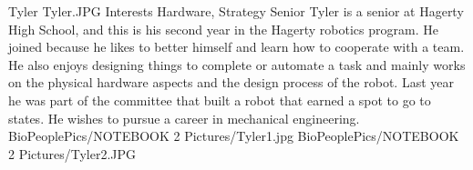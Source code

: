\insertbio
{Tyler}
{Tyler.JPG}
{Interests}
{Hardware, Strategy}
{Senior}
{  
Tyler is a senior at Hagerty High School, and this is his second year in the Hagerty robotics program. He joined because he likes to better himself and learn how to cooperate with a team. He also enjoys designing things to complete or automate a task and mainly works on the physical hardware aspects and the design process of the robot. Last year he was part of the committee that built a robot that earned a spot to go to states. He wishes to pursue a career in mechanical engineering. 
}
{BioPeoplePics/NOTEBOOK 2 Pictures/Tyler1.jpg}
{BioPeoplePics/NOTEBOOK 2 Pictures/Tyler2.JPG}
